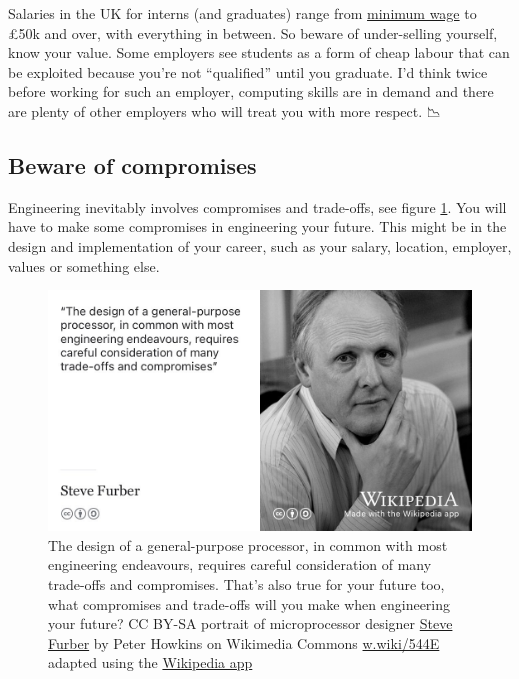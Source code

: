 \documentclass[
]{book}
\begin{document}
Salaries in the UK for interns (and graduates) range from \href{https://www.gov.uk/national-minimum-wage}{minimum wage} to £50k and over, with everything in between. So beware of under-selling yourself, know your value. Some employers see students as a form of cheap labour that can be exploited because you're not ``qualified'' until you graduate. I'd think twice before working for such an employer, computing skills are in demand and there are plenty of other employers who will treat you with more respect. 📉

\hypertarget{compromises}{%
\subsection{Beware of compromises}\label{compromises}}

Engineering inevitably involves compromises and trade-offs, see figure \ref{fig:furber-fig}. You will have to make some compromises in engineering your future. This might be in the design and implementation of your career, such as your salary, location, employer, values or something else.

\begin{figure}

{\centering \includegraphics[width=0.98\linewidth]{images/steve-furber} 

}

\caption{The design of a general-purpose processor, in common with most engineering endeavours, requires careful consideration of many trade-offs and compromises. \citep{furberarm} That's also true for your future too, what compromises and trade-offs will you make when engineering your future? CC BY-SA portrait of microprocessor designer \href{https://en.wikipedia.org/wiki/Steve_Furber}{Steve Furber} by Peter Howkins on Wikimedia Commons \href{https://w.wiki/544E}{w.wiki/544E} adapted using the \href{https://apps.apple.com/gb/app/wikipedia/id324715238}{Wikipedia app}}\label{fig:furber-fig}
\end{figure}
\end{document}
